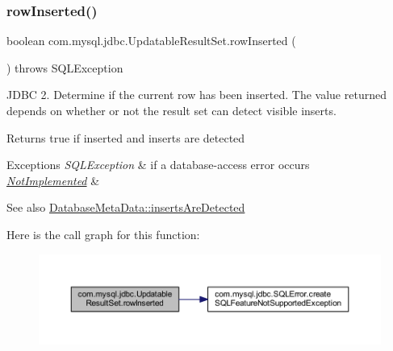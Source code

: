 \subsubsection{\texorpdfstring{row\+Inserted()}{rowInserted()}}
{\footnotesize\ttfamily boolean com.\+mysql.\+jdbc.\+Updatable\+Result\+Set.\+row\+Inserted (\begin{DoxyParamCaption}{ }\end{DoxyParamCaption}) throws S\+Q\+L\+Exception}

J\+D\+BC 2. Determine if the current row has been inserted. The value returned depends on whether or not the result set can detect visible inserts.

\begin{DoxyReturn}{Returns}
true if inserted and inserts are detected
\end{DoxyReturn}

\begin{DoxyExceptions}{Exceptions}
{\em S\+Q\+L\+Exception} & if a database-\/access error occurs \\
\hline
{\em \mbox{\hyperlink{classcom_1_1mysql_1_1jdbc_1_1_not_implemented}{Not\+Implemented}}} & \\
\hline
\end{DoxyExceptions}
\begin{DoxySeeAlso}{See also}
\mbox{\hyperlink{classcom_1_1mysql_1_1jdbc_1_1_database_meta_data_a06d1f2ed6eef1ddae5b42a8606644903}{Database\+Meta\+Data\+::inserts\+Are\+Detected}} 
\end{DoxySeeAlso}
Here is the call graph for this function\+:
\nopagebreak
\begin{figure}[H]
\begin{center}
\leavevmode
\includegraphics[width=350pt]{classcom_1_1mysql_1_1jdbc_1_1_updatable_result_set_a50cd8500080d2403e86b968b0cd9718b_cgraph}
\end{center}
\end{figure}
\mbox{\label{classcom_1_1mysql_1_1jdbc_1_1_updatable_result_set_a220d6c10abf185de3588e99132f5f68f}} 
